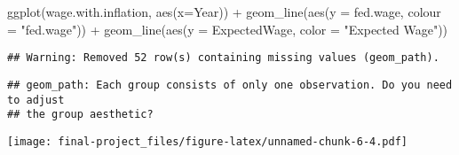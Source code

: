 \documentclass[
]{article}
\newenvironment{Shaded}{\begin{snugshade}}{\end{snugshade}}
\newcommand{\AttributeTok}[1]{\textcolor[rgb]{0.77,0.63,0.00}{#1}}
\newcommand{\FunctionTok}[1]{\textcolor[rgb]{0.00,0.00,0.00}{#1}}
\newcommand{\NormalTok}[1]{#1}
\newcommand{\SpecialCharTok}[1]{\textcolor[rgb]{0.00,0.00,0.00}{#1}}
\newcommand{\StringTok}[1]{\textcolor[rgb]{0.31,0.60,0.02}{#1}}
\begin{document}
\begin{Shaded}
\begin{Highlighting}[]
\FunctionTok{ggplot}\NormalTok{(wage.with.inflation, }\FunctionTok{aes}\NormalTok{(}\AttributeTok{x=}\NormalTok{Year)) }\SpecialCharTok{+} 
  \FunctionTok{geom\_line}\NormalTok{(}\FunctionTok{aes}\NormalTok{(}\AttributeTok{y =}\NormalTok{ fed.wage, }\AttributeTok{colour =} \StringTok{"fed.wage"}\NormalTok{)) }\SpecialCharTok{+} 
  \FunctionTok{geom\_line}\NormalTok{(}\FunctionTok{aes}\NormalTok{(}\AttributeTok{y =}\NormalTok{ ExpectedWage, }\AttributeTok{color =} \StringTok{"Expected Wage"}\NormalTok{))}
\end{Highlighting}
\end{Shaded}

\begin{verbatim}
## Warning: Removed 52 row(s) containing missing values (geom_path).
\end{verbatim}

\begin{verbatim}
## geom_path: Each group consists of only one observation. Do you need to adjust
## the group aesthetic?
\end{verbatim}

\texttt{[image: final-project\_files/figure-latex/unnamed-chunk-6-4.pdf]}
\end{document}
